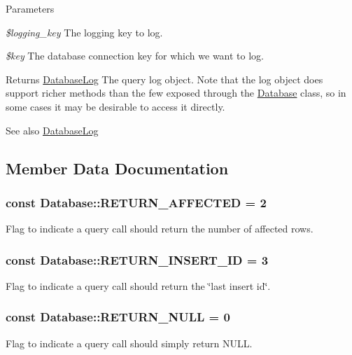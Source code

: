 \begin{DoxyParams}{Parameters}
\item[{\em \$logging\_\-key}]The logging key to log. \item[{\em \$key}]The database connection key for which we want to log.\end{DoxyParams}
\begin{DoxyReturn}{Returns}
\hyperlink{classDatabaseLog}{DatabaseLog} The query log object. Note that the log object does support richer methods than the few exposed through the \hyperlink{classDatabase}{Database} class, so in some cases it may be desirable to access it directly.
\end{DoxyReturn}
\begin{DoxySeeAlso}{See also}
\hyperlink{classDatabaseLog}{DatabaseLog} 
\end{DoxySeeAlso}


\subsection{Member Data Documentation}
\hypertarget{classDatabase_a557879c7732a573ed395f9196afeb898}{
\subsubsection[{RETURN\_\-AFFECTED}]{\setlength{\rightskip}{0pt plus 5cm}const {\bf Database::RETURN\_\-AFFECTED} = 2}}
\label{classDatabase_a557879c7732a573ed395f9196afeb898}
Flag to indicate a query call should return the number of affected rows. \hypertarget{classDatabase_a56dab08fbf70f81aaf6f55a71922f4ef}{
\subsubsection[{RETURN\_\-INSERT\_\-ID}]{\setlength{\rightskip}{0pt plus 5cm}const {\bf Database::RETURN\_\-INSERT\_\-ID} = 3}}
\label{classDatabase_a56dab08fbf70f81aaf6f55a71922f4ef}
Flag to indicate a query call should return the \char`\"{}last insert id\char`\"{}. \hypertarget{classDatabase_ae00484bf91c4447fc1b391408f7cfbd3}{
\subsubsection[{RETURN\_\-NULL}]{\setlength{\rightskip}{0pt plus 5cm}const {\bf Database::RETURN\_\-NULL} = 0}}
\label{classDatabase_ae00484bf91c4447fc1b391408f7cfbd3}
Flag to indicate a query call should simply return NULL.

